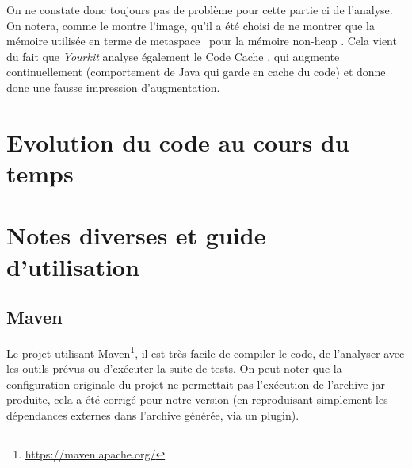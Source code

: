 \documentclass[12pt, openany]{report}
\begin{document}
On ne constate donc toujours pas de problème pour cette partie ci de l'analyse. On notera, comme le montre l'image, qu'il a été choisi de ne montrer que la mémoire utilisée en terme de \og metaspace \fg \, pour la mémoire \og non-heap \fg. Cela vient du fait que \textit{Yourkit} analyse également le \og Code Cache \fg, qui augmente continuellement (comportement de Java qui garde en cache du code) et donne donc une fausse impression d'augmentation.

\section{Evolution du code au cours du temps}



\section{Notes diverses et guide d'utilisation}
\subsection{Maven}
Le projet utilisant Maven\footnote{\url{https://maven.apache.org/}}, il est très facile de compiler le code, de l'analyser avec les outils prévus ou d'exécuter la suite de tests.
On peut noter que la configuration originale du projet ne permettait pas l'exécution de l'archive jar produite, cela a été corrigé pour notre version (en reproduisant simplement les dépendances externes dans l'archive générée, via un plugin).
\end{document}
